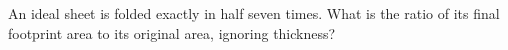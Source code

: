 An ideal sheet is folded exactly in half seven times. What is the ratio of its final footprint area to its original area, ignoring thickness?
